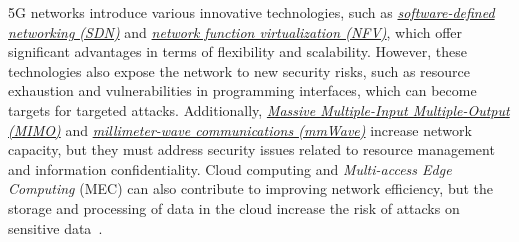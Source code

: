 \documentclass[english]{article}
\begin{document}
5G networks introduce various innovative technologies, such as
\textit{\hyperlink{SDN}{software-defined networking (SDN)}} and
\textit{\hyperlink{NFV}{network function virtualization (NFV)}},
which offer significant advantages in terms of flexibility and
scalability. However, these technologies also expose the network
to new security risks, such as resource exhaustion and vulnerabilities
in programming interfaces, which can become targets for targeted attacks.
Additionally, \textit{\hyperlink{MIMO}{Massive Multiple-Input Multiple-Output (MIMO)}}
and \textit{\hyperlink{mmWave}{millimeter-wave communications (mmWave)}}
increase network capacity, but they must address security issues related to
resource management and information confidentiality. Cloud computing and
\textit{Multi-access Edge Computing} (MEC) can also contribute to improving
network efficiency, but the storage and processing of data in the cloud increase
the risk of attacks on sensitive data~\cite{Ahmad2019Security}.
\end{document}

